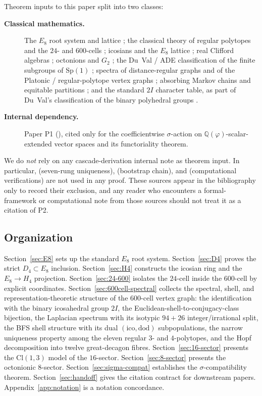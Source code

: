 \documentclass[11pt, a4paper]{amsart}
\theoremstyle{definition}
\newcommand{\Q}{\mathbb{Q}}
\newcommand{\Cl}{\mathrm{Cl}}
\begin{document}
Theorem inputs to this paper split into two classes:
\begin{description}
\item[\textbf{Classical mathematics.}] The $E_8$ root system and
  lattice \cite{Humphreys, Bourbaki}; the classical theory of
  regular polytopes and the $24$- and $600$-cells
  \cite{CoxeterRegularPolytopes}; icosians and the $E_8$ lattice
  \cite{ConwaySloane, MoodyPatera}; real Clifford algebras
  \cite{Lounesto, Chevalley}; octonions and $G_2$
  \cite{BaezOctonions, SchaferNonassociative}; the Du~Val / ADE
  classification of the finite subgroups of $\mathrm{Sp}(1)$
  \cite{DuVal1964}; spectra of distance-regular graphs and of
  the Platonic / regular-polytope vertex graphs
  \cite{BrouwerHaemers2012, GodsilRoyle2001}; absorbing Markov
  chains and equitable partitions \cite{KemenySnell1976,
  GodsilRoyle2001}; and the standard $2I$ character table, as
  part of Du~Val's classification of the binary polyhedral groups
  \cite[Ch.~3]{DuVal1964}.
\item[\textbf{Internal dependency.}] Paper P1
  (\cite{SigmaRationality}), cited only for the coefficientwise
  $\sigma$-action on $\Q(\varphi)$-scalar-extended vector spaces
  and its functoriality theorem.
\end{description}

We do \emph{not} rely on any cascade-derivation internal note as
theorem input. In particular, \cite[\S F3]{CascadeFoundations}
(seven-rung uniqueness), \cite[\S\S P4--P8]{CascadePregeometry}
(bootstrap chain), and \cite[\S 12]{CascadeEmbeddings}
(computational verifications) are not used in any proof. These
sources appear in the bibliography only to record their exclusion,
and any reader who encounters a formal-framework or computational
note from those sources should not treat it as a citation of
P2.

\subsection{Organization}

Section~\ref{sec:E8} sets up the standard $E_8$ root system.
Section~\ref{sec:D4} proves the strict $D_4 \subset E_8$ inclusion.
Section~\ref{sec:H4} constructs the icosian ring and the $E_8 \to
H_4$ projection. Section~\ref{sec:24-600} isolates the $24$-cell
inside the $600$-cell by explicit coordinates.
Section~\ref{sec:600cell-spectral} collects the
spectral, shell, and representation-theoretic structure of the
$600$-cell vertex graph: the identification with the binary
icosahedral group $2I$, the Euclidean-shell-to-conjugacy-class
bijection, the Laplacian spectrum with its isotypic $94{+}26$
integer/irrational split, the BFS shell structure with its dual
$(\mathrm{ico}, \mathrm{dod})$ subpopulations, the narrow
uniqueness property among the eleven regular $3$- and
$4$-polytopes, and the Hopf decomposition into twelve great-decagon
fibres. Section~\ref{sec:16-sector} presents the $\Cl(1,3)$ model
of the $16$-sector. Section~\ref{sec:8-sector} presents the
octonionic $8$-sector. Section~\ref{sec:sigma-compat} establishes
the $\sigma$-compatibility theorem. Section~\ref{sec:handoff}
gives the citation contract for downstream papers.
Appendix~\ref{app:notation} is a notation concordance.
\end{document}
